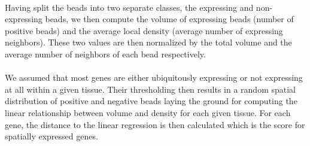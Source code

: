 \documentclass[10pt,a4paper]{article}
\begin{document}
\paragraph{}Having split the beads into two separate classes, the expressing and non-expressing beads, we then compute the volume of expressing beads (number of positive beads) and the average local density (average number of expressing neighbors). These two values are then normalized by the total volume and the average number of neighbors of each bead respectively.
\paragraph{}We assumed that most genes are either ubiquitously expressing or not expressing at all within a given tissue.
Their thresholding then results in a random spatial distribution of positive and negative beads laying the ground for computing the linear relationship between volume and density for each given tissue.
For each gene, the distance to the linear regression is then calculated which is the score for spatially expressed genes.


\end{document}
